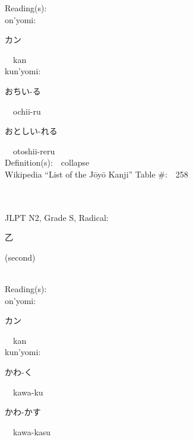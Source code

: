 \begin{multicols}{2}
Reading(s):\ \ \\
{\hspace*{1em}}on'yomi:\ \ \\
{\hspace*{2em}}{\begin{CJK}{UTF8}{min} カン \end{CJK}}\ \ kan\ \ \\
{\hspace*{1em}}kun'yomi:\ \ \\
{\hspace*{2em}}{\begin{CJK}{UTF8}{min} おちい-る \end{CJK}}\ \ ochii-ru\ \ \\
{\hspace*{2em}}{\begin{CJK}{UTF8}{min} おとしい-れる \end{CJK}}\ \ otoshii-reru\ \ \\
Definition(s):\ \ collapse \\
Wikipedia ``List of the J\=oy\=o Kanji'' Table \#:\ \ 258 \\
\ \ \\
{\fontsize{34pt}{40pt}  }\ \ \\  %
{JLPT N2, Grade S, Radical:\ \ {\begin{CJK}{UTF8}{min} 乙 \end{CJK}} (second) } \\
Reading(s):\ \ \\
{\hspace*{1em}}on'yomi:\ \ \\
{\hspace*{2em}}{\begin{CJK}{UTF8}{min} カン \end{CJK}}\ \ kan\ \ \\
{\hspace*{1em}}kun'yomi:\ \ \\
{\hspace*{2em}}{\begin{CJK}{UTF8}{min} かわ-く \end{CJK}}\ \ kawa-ku\ \ \\
{\hspace*{2em}}{\begin{CJK}{UTF8}{min} かわ-かす \end{CJK}}\ \ kawa-kasu\ \ \\

\end{multicols}
